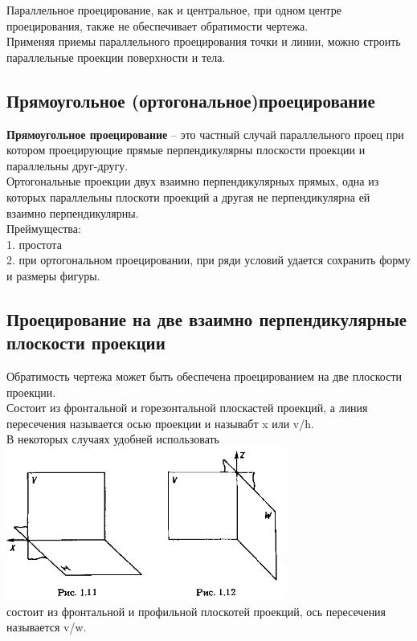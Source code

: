 \documentclass[a4paper, 12pt]{article}
\begin{document}
Параллельное проецирование, как и центральное, при одном центре проецирования, также не обеспечивает обратимости чертежа.\\
Применяя приемы параллельного проецирования точки и линии, можно строить параллельные проекции поверхности и тела.\\

\subsection{Прямоугольное (ортогональное)проецирование}

\textbf{Прямоугольное проецирование} -- это частный случай параллельного проец при котором проецирующие прямые перпендикулярны плоскости проекции и параллельны друг-другу.
\\
Ортогональные проекции двух взаимно перпендикулярных прямых, одна из которых параллельны плоскоти проекций а другая не перпендикулярна ей взаимно перпендикулярны.\\
Преймущества:\\
1. простота\\
2. при ортогональном проецировании, при ряди условий удается сохранить форму и размеры фигуры.\\

\subsection{Проецирование на две взаимно перпендикулярные плоскости проекции}
Обратимость чертежа может быть обеспечена проецированием на две плоскости проекции.\\

Состоит из фронтальной и горезонтальной плоскастей проекций, а линия пересечения называется осью проекции и называбт x или v/h.\\

В некоторых случаях удобней использовать\\
\includegraphics{143}\\
состоит из фронтальной и профильной плоскотей проекций, ось пересечения называется v/w.\\
\end{document}
